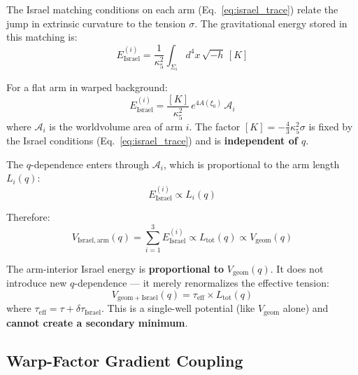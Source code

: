 The Israel matching conditions on each arm (Eq.~\eqref{eq:israel_trace})
relate the jump in extrinsic curvature to the tension $\sigma$.
The gravitational energy stored in this matching is:
\begin{equation}
    E_{\mathrm{Israel}}^{(i)} = \frac{1}{\kappa_5^2}\int_{\Sigma_i}
    d^4x\, \sqrt{-h}\, [K]
    \label{eq:E_israel_arm}
\end{equation}

For a flat arm in warped background:
\begin{equation}
    E_{\mathrm{Israel}}^{(i)} = \frac{[K]}{\kappa_5^2}\,
    e^{4A(\xi_0)}\, \mathcal{A}_i
    \label{eq:E_israel_flat}
\end{equation}
where $\mathcal{A}_i$ is the worldvolume area of arm $i$.
The factor $[K] = -\frac{4}{3}\kappa_5^2\sigma$ is fixed by the
Israel conditions (Eq.~\eqref{eq:israel_trace}) and is
\textbf{independent of $q$}.

The $q$-dependence enters through $\mathcal{A}_i$, which is
proportional to the arm length $L_i(q)$:
\begin{equation}
    E_{\mathrm{Israel}}^{(i)} \propto L_i(q)
    \label{eq:E_israel_prop_L}
\end{equation}

Therefore:
\begin{equation}
    V_{\mathrm{Israel,arm}}(q) = \sum_{i=1}^3 E_{\mathrm{Israel}}^{(i)}
    \propto L_{\mathrm{tot}}(q) \propto V_{\mathrm{geom}}(q)
    \label{eq:V_israel_arm}
\end{equation}

\begin{resultbox}[title=Arm-Interior Israel Energy]
The arm-interior Israel energy is \textbf{proportional to}
$V_{\mathrm{geom}}(q)$. It does not introduce new $q$-dependence
--- it merely renormalizes the effective tension:
\begin{equation}
    V_{\mathrm{geom+Israel}}(q) = \tau_{\mathrm{eff}} \times L_{\mathrm{tot}}(q)
\end{equation}
where $\tau_{\mathrm{eff}} = \tau + \delta\tau_{\mathrm{Israel}}$.
This is a single-well potential (like $V_{\mathrm{geom}}$ alone) and
\textbf{cannot create a secondary minimum}. \tagDc
\end{resultbox}

\subsection{Warp-Factor Gradient Coupling}

